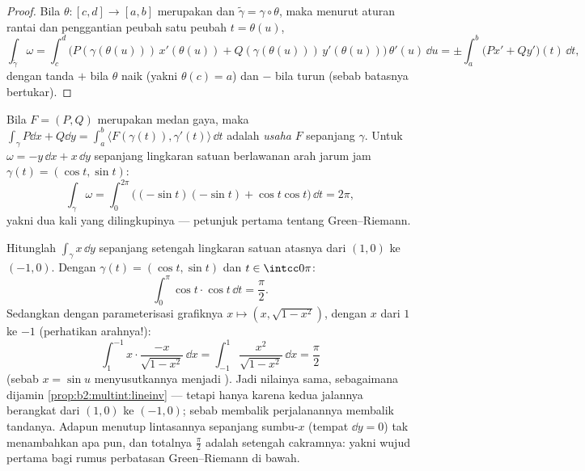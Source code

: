 \begin{proof}
Bila $\theta \colon [c, d] \to [a, b]$ merupakan  dan
$\tilde\gamma = \gamma \circ \theta$, maka menurut aturan rantai dan
penggantian peubah satu peubah $t = \theta(u)$,
\[
\int_{\tilde\gamma}\omega
= \int_c^d \bigl(P(\gamma(\theta(u)))\,x'(\theta(u))
+ Q(\gamma(\theta(u)))\,y'(\theta(u))\bigr)\,\theta'(u)\,\dd u
= \pm\int_a^b \bigl(Px' + Qy'\bigr)(t)\,\dd t ,
\]
dengan tanda $+$ bila $\theta$ naik (yakni $\theta(c) = a$) dan $-$
bila turun (sebab batasnya bertukar).
\end{proof}

\begin{example}\label{ex:b2:multint:work}
Bila $F = (P, Q)$ merupakan medan gaya, maka $\int_\gamma P\dd x + Q\dd y =
\int_a^b \langle F(\gamma(t)), \gamma'(t)\rangle\,\dd t$ adalah
\emph{usaha} $F$ sepanjang $\gamma$. Untuk $\omega = -y\,\dd x +
x\,\dd y$ sepanjang lingkaran satuan berlawanan arah jarum jam $\gamma(t) =
(\cos t, \sin t)$:
\[
\int_\gamma \omega
= \int_0^{2\pi}\bigl((-\sin t)(-\sin t)
+ \cos t\cos t\bigr)\,\dd t = 2\pi ,
\]
yakni dua kali  yang dilingkupinya --- petunjuk pertama tentang Green--Riemann.
\end{example}

\begin{example}\label{ex:b2:multint:semicircle}
Hitunglah $\int_\gamma x\,\dd y$ sepanjang setengah lingkaran satuan
atasnya dari $(1, 0)$ ke $(-1, 0)$. Dengan $\gamma(t) =
(\cos t, \sin t)$ dan $t \in \intcc0\pi$:
\[
\int_0^\pi\cos t\cdot\cos t\,\dd t = \frac\pi2 .
\]
Sedangkan dengan parameterisasi grafiknya $x \mapsto (x, \sqrt{1 -
x^2})$, dengan $x$ dari $1$ ke $-1$ (perhatikan arahnya!):
\[
\int_1^{-1}x\cdot\frac{-x}{\sqrt{1 - x^2}}\,\dd x
= \int_{-1}^{1}\frac{x^2}{\sqrt{1 - x^2}}\,\dd x
= \frac\pi2
\]
(sebab $x = \sin u$ menyusutkannya menjadi ). Jadi nilainya sama,
sebagaimana dijamin \cref{prop:b2:multint:lineinv} --- tetapi hanya
karena kedua jalannya berangkat dari $(1,0)$ ke $(-1,0)$; sebab membalik
perjalanannya membalik tandanya. Adapun menutup lintasannya sepanjang sumbu-$x$
(tempat $\dd y = 0$) tak menambahkan apa pun, dan totalnya $\frac\pi2$
adalah  setengah cakramnya: yakni wujud pertama bagi
rumus  perbatasan Green--Riemann di bawah.
\end{example}

